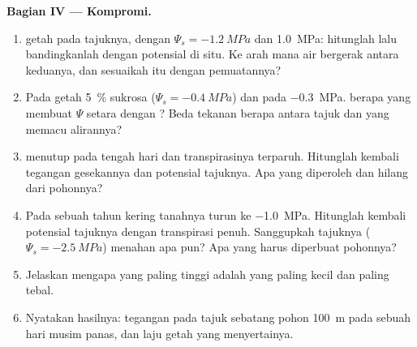 \begin{problem}
\medskip
\noindent\textbf{Bagian IV --- Kompromi.}
\begin{enumerate}[resume]
  \item {} getah  pada tajuknya, dengan
        $\Psi_s = \qty{-1.2}{MPa}$ dan  \qty{1.0}{MPa}: hitunglah
        lalu bandingkanlah dengan potensial  di situ. Ke arah
        mana air bergerak antara keduanya, dan sesuaikah itu dengan
        pemuatannya?
  \item Pada  getah  \qty{5}{\%} sukrosa ($\Psi_s =
        \qty{-0.4}{MPa}$) dan  pada \qty{-0.3}{MPa}. 
        berapa yang membuat $\Psi$  setara dengan ? Beda
        tekanan berapa antara tajuk dan  yang memacu alirannya?
  \item {} menutup pada tengah hari dan transpirasinya
        terparuh. Hitunglah kembali tegangan gesekannya dan potensial
         tajuknya. Apa yang diperoleh dan hilang dari pohonnya?
  \item Pada sebuah tahun kering tanahnya turun ke \qty{-1.0}{MPa}.
        Hitunglah kembali potensial tajuknya dengan transpirasi penuh.
        Sanggupkah  tajuknya ($\Psi_s = \qty{-2.5}{MPa}$) menahan
         apa pun? Apa yang harus diperbuat pohonnya?
  \item Jelaskan mengapa  yang paling tinggi adalah yang paling
        kecil dan paling tebal.
  \item Nyatakan hasilnya: tegangan  pada tajuk sebatang pohon
        \qty{100}{m} pada sebuah hari musim panas, dan laju getah yang
        menyertainya.
\end{enumerate}
\end{problem}
